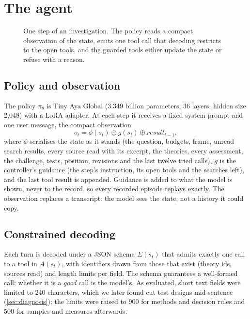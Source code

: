 \section{The agent}\label{sec:agent}

\begin{figure}[t]\centering
\resizebox{0.92\linewidth}{!}{}
\caption{One step of an investigation. The policy reads a compact observation of the state, emits one tool call that
decoding restricts to the open tools, and the guarded tools either update the state or refuse with a reason.}
\label{fig:loop}
\end{figure}

\subsection{Policy and observation}
The policy $\pi_\theta$ is Tiny Aya Global \citep{tinyaya} (3.349 billion parameters, 36 layers, hidden size 2{,}048)
with a LoRA adapter. At each step it receives a fixed system prompt and one user message, the compact observation
\begin{equation}
  o_t = \phi(s_t) \oplus g(s_t) \oplus \textit{result}_{t-1},
\end{equation}
where $\phi$ serialises the state as it stands (the question, budgets, frame, unread search results, every source read
with its excerpt, the theories, every assessment, the challenge, tests, position, revisions and the last twelve tried
calls), $g$ is the controller's guidance (the step's instruction, its open tools and the searches left), and the last
tool result is appended. Guidance is added to what the model is shown, never to the record, so every recorded episode
replays exactly. The observation replaces a transcript: the model sees the state, not a history it could copy.

\subsection{Constrained decoding}
Each turn is decoded under a JSON schema $\Sigma(s_t)$ that admits exactly one call to a tool in $A(s_t)$, with
identifiers drawn from those that exist (theory ids, sources read) and length limits per field. The schema guarantees a
well-formed call; whether it is a \emph{good} call is the model's. As evaluated, short text fields were limited to 240
characters, which we later found cut test designs mid-sentence (\cref{sec:diagnosis}); the limits were raised to 900
for methods and decision rules and 500 for samples and measures afterwards.

